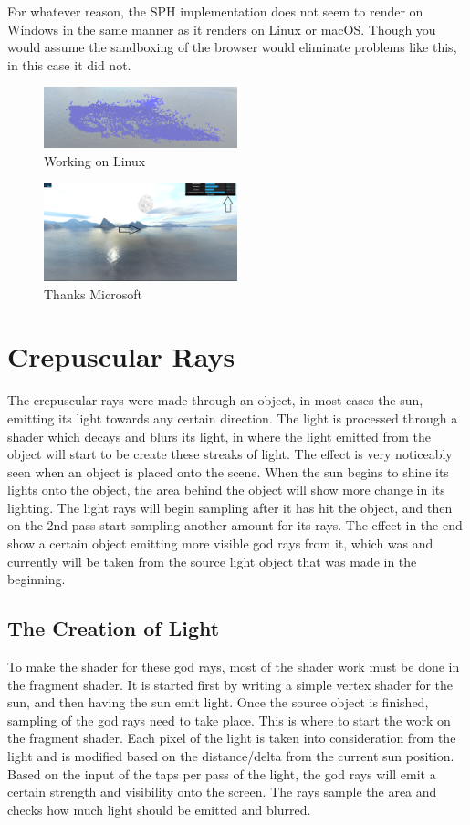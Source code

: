 For whatever reason, the SPH implementation does not seem to render on Windows in the same manner as
it renders on Linux or macOS. Though you would assume the sandboxing of the browser would eliminate problems like this, in this case it did not.  \\
\begin{figure}
\includegraphics[width=0.5\textwidth]{sph_linux} 
\caption{Working on Linux}
\end{figure}
\begin{figure}
\includegraphics[width=0.5\textwidth]{water_win} 
\caption{Thanks Microsoft}
\end{figure}
\section{Crepuscular Rays}
The crepuscular rays were made through an object, in most cases the sun, emitting its light towards any certain direction. The light is processed through a shader which decays and blurs its light, in where the light emitted from the object will start to be create these streaks of light. The effect is very noticeably seen when an object is placed onto the scene. When the sun begins to shine its lights onto the object, the area behind the object will show more change in its lighting. The light rays will begin sampling after it has hit the object, and then on the 2nd pass start sampling another amount for its rays. The effect in the end show a certain object emitting more visible god rays from it, which was and currently will be taken from the source light object that was made in the beginning.

\subsection{The Creation of Light}
To make the shader for these god rays, most of the shader work must be done in the fragment shader. It is started first by writing a simple vertex shader for the sun, and then having the sun emit light. Once the source object is finished, sampling of the god rays need to take place. This is where to start the work on the fragment shader. Each pixel of the light is taken into consideration from the light and is modified based on the distance/delta from the current sun position. Based on the input of the taps per pass of the light, the god rays will emit a certain strength and visibility onto the screen. The rays sample the area and checks how much light should be emitted and blurred. 



